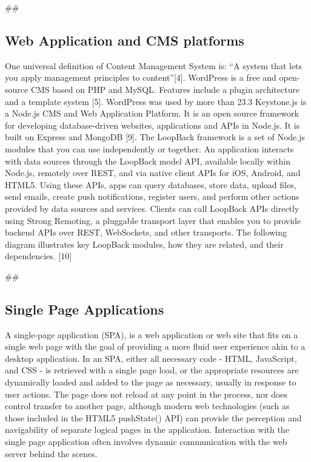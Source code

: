 \documentclass{sig-alternate}
\begin{document}
## \subsection{Web Application and CMS platforms}

One universal definition of Content Management System is: ``A system that lets you apply management principles to content''[4].
WordPress is a free and open-source CMS based on PHP and MySQL. Features include a plugin architecture and a template system [5]. WordPress was used by more than 23.3%
Keystone.js is a Node.js CMS and Web Application Platform. It is an open source framework for developing database-driven websites, applications and APIs in Node.js. It is built on Express and MongoDB [9].
The LoopBack framework is a set of Node.js modules that you can use independently or together.  
An application interacts with data sources through the LoopBack model API, available locally within Node.js, remotely over REST, and via native client APIs for iOS, Android, and HTML5. Using these APIs, apps can query databases, store data, upload files, send emails, create push notifications, register users, and perform other actions provided by data sources and services.
Clients can call LoopBack APIs directly using Strong Remoting, a pluggable transport layer that enables you to provide backend APIs over REST, WebSockets, and other transports.
The following diagram illustrates key LoopBack modules, how they are related, and their dependencies. [10]

## \subsection{Single Page Applications}

A single-page application (SPA), is a web application or web site that fits on a single web page with the goal of providing a more fluid user experience akin to a desktop application. In an SPA, either all necessary code - HTML, JavaScript, and CSS - is retrieved with a single page load, or the appropriate resources are dynamically loaded and added to the page as necessary, usually in response to user actions. The page does not reload at any point in the process, nor does control transfer to another page, although modern web technologies (such as those included in the HTML5 pushState() API) can provide the perception and navigability of separate logical pages in the application. Interaction with the single page application often involves dynamic communication with the web server behind the scenes.
\end{document}

